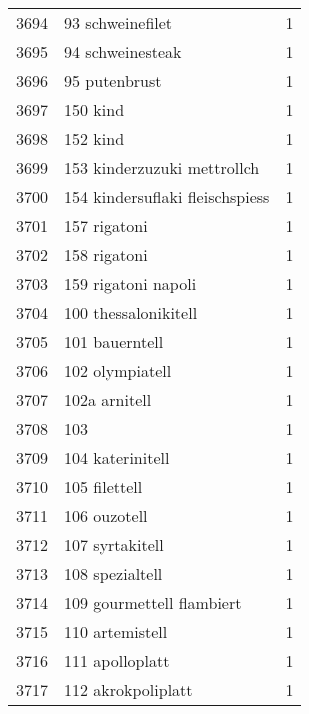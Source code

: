\begin{tabular}{llr}
3694 &                                   93 schweinefilet &      1 \\
3695 &                                   94 schweinesteak &      1 \\
3696 &                                      95 putenbrust &      1 \\
3697 &                                           150 kind &      1 \\
3698 &                                           152 kind &      1 \\
3699 &                        153 kinderzuzuki mettrollch &      1 \\
3700 &                    154 kindersuflaki fleischspiess &      1 \\
3701 &                                       157 rigatoni &      1 \\
3702 &                                       158 rigatoni &      1 \\
3703 &                                159 rigatoni napoli &      1 \\
3704 &                               100 thessalonikitell &      1 \\
3705 &                                     101 bauerntell &      1 \\
3706 &                                    102 olympiatell &      1 \\
3707 &                                      102a arnitell &      1 \\
3708 &                                                103 &      1 \\
3709 &                                   104 katerinitell &      1 \\
3710 &                                      105 filettell &      1 \\
3711 &                                       106 ouzotell &      1 \\
3712 &                                    107 syrtakitell &      1 \\
3713 &                                    108 spezialtell &      1 \\
3714 &                          109 gourmettell flambiert &      1 \\
3715 &                                    110 artemistell &      1 \\
3716 &                                    111 apolloplatt &      1 \\
3717 &                                 112 akrokpoliplatt &      1 \\

\end{tabular}
